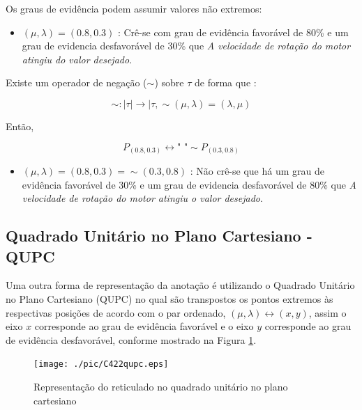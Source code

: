 Os graus de evidência podem assumir valores não extremos:

\begin{itemize}
\item 
$(\mu, \lambda ) = (0.8,0.3)$ : Crê-se com grau de evidência favorável de 80\% e um grau de evidencia desfavorável de 30\%  que \emph{A velocidade de rotação do motor atingiu do valor desejado}.
\end{itemize}

Existe um operador de negação ($\sim $) sobre $\tau$ de forma que :
\begin{center}
\begin{equation}
\sim  : \mid \tau \mid \rightarrow \mid \tau , \sim(\mu, \lambda ) = (\lambda, \mu )
\end{equation}
\end{center}

Então,
\begin{center}
\begin{equation}
P_{(0.8,0.3)} \leftrightarrow \textrm{"   "} \sim P_{(0.3,0.8)}
\end{equation}
\end{center}

\begin{itemize}
\item 
$(\mu, \lambda ) = (0.8,0.3) = \sim (0.3,0.8)$ : Não crê-se que há um grau de evidência favorável de 30\% e um grau de evidencia desfavorável de 80\% que \emph{A velocidade de rotação do motor atingiu o valor desejado}.
\end{itemize}



\subsection{Quadrado Unitário no Plano Cartesiano - QUPC}

Uma outra forma de representação da anotação é utilizando o Quadrado Unitário no Plano Cartesiano (QUPC) no qual são transpostos os pontos extremos às respectivas posições de acordo com o par ordenado,  $(\mu, \lambda ) \leftrightarrow (x,y) $, assim o eixo $x$ corresponde ao grau de evidência favorável e o eixo $y$ corresponde ao grau de evidência desfavorável, conforme mostrado na Figura \ref{fig:reticuladoQUPC}.



\begin{figure}[!htb]
\center\texttt{[image: ./pic/C422qupc.eps]}
\caption{Representação do reticulado no quadrado unitário no plano cartesiano}
\label{fig:reticuladoQUPC}
\end{figure}

